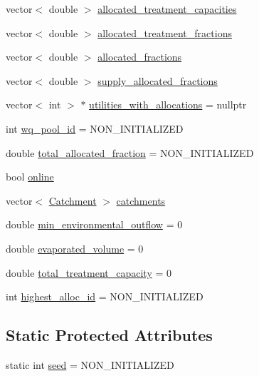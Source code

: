 \begin{DoxyCompactItemize}
vector$<$ double $>$ \mbox{\hyperlink{classWaterSource_a87dc0bfb5cf4e2b9a953c7a80058c923}{allocated\+\_\+treatment\+\_\+capacities}}
\item 
vector$<$ double $>$ \mbox{\hyperlink{classWaterSource_aa73fe10cfc6579b2fb79529e1dde5140}{allocated\+\_\+treatment\+\_\+fractions}}
\item 
vector$<$ double $>$ \mbox{\hyperlink{classWaterSource_a2f6655a80c4847fe039987255d9d998c}{allocated\+\_\+fractions}}
\item 
vector$<$ double $>$ \mbox{\hyperlink{classWaterSource_a87535be59994b2602576cdf34dbe04b9}{supply\+\_\+allocated\+\_\+fractions}}
\item 
vector$<$ int $>$ $\ast$ \mbox{\hyperlink{classWaterSource_ac345583fc2d0f7e1db31ee40244d7ace}{utilities\+\_\+with\+\_\+allocations}} = nullptr
\item 
int \mbox{\hyperlink{classWaterSource_acef73d9b1675fb6db9ec39347514db6d}{wq\+\_\+pool\+\_\+id}} = N\+O\+N\+\_\+\+I\+N\+I\+T\+I\+A\+L\+I\+Z\+ED
\item 
double \mbox{\hyperlink{classWaterSource_a4be6864dc196287bdf8329b3aa6ca662}{total\+\_\+allocated\+\_\+fraction}} = N\+O\+N\+\_\+\+I\+N\+I\+T\+I\+A\+L\+I\+Z\+ED
\item 
bool \mbox{\hyperlink{classWaterSource_aef4e289b47c2360f2e991ea3ee535781}{online}}
\item 
vector$<$ \mbox{\hyperlink{classCatchment}{Catchment}} $>$ \mbox{\hyperlink{classWaterSource_a8c18c34f23f8a06685c1d12f462ed830}{catchments}}
\item 
double \mbox{\hyperlink{classWaterSource_adae67ac96597e4b25332002b88a9a52b}{min\+\_\+environmental\+\_\+outflow}} = 0
\item 
double \mbox{\hyperlink{classWaterSource_a6085899c4b4cc40fa80784203e1a9755}{evaporated\+\_\+volume}} = 0
\item 
double \mbox{\hyperlink{classWaterSource_a2fdfd5ff7d103e71108cf2a31babaccb}{total\+\_\+treatment\+\_\+capacity}} = 0
\item 
int \mbox{\hyperlink{classWaterSource_a83c6dcf19b64533ce4bc3b918ce6cc8e}{highest\+\_\+alloc\+\_\+id}} = N\+O\+N\+\_\+\+I\+N\+I\+T\+I\+A\+L\+I\+Z\+ED
\end{DoxyCompactItemize}
\subsection*{Static Protected Attributes}
\begin{DoxyCompactItemize}
\item 
static int \mbox{\hyperlink{classWaterSource_abaf6cb0ecca08c87428ad516f11f8c2e}{seed}} = N\+O\+N\+\_\+\+I\+N\+I\+T\+I\+A\+L\+I\+Z\+ED
\end{DoxyCompactItemize}


